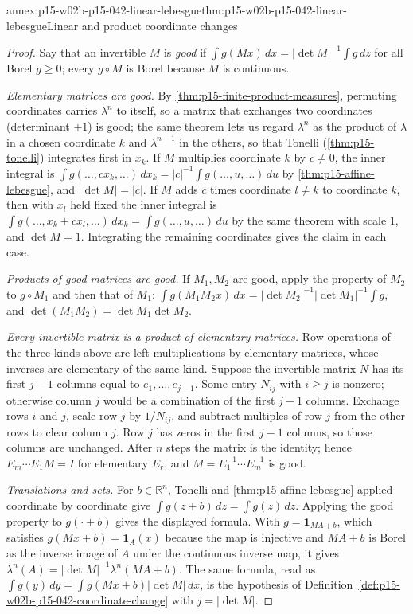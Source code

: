 \begin{annexitem}{annex:p15-w02b-p15-042-linear-lebesgue}{thm:p15-w02b-p15-042-linear-lebesgue}{Linear and product coordinate changes}
\begin{proof}
Say that an invertible \(M\) is \emph{good} if
\(\int g(Mx)\,dx=|\det M|^{-1}\int g\,dz\) for all Borel \(g\geq0\); every
\(g\circ M\) is Borel because \(M\) is continuous.

\emph{Elementary matrices are good.} By
\cref{thm:p15-finite-product-measures}, permuting coordinates carries
\(\lambda^n\) to itself, so a matrix that exchanges two coordinates
(determinant \(\pm1\)) is good; the same theorem lets us regard \(\lambda^n\)
as the product of \(\lambda\) in a chosen coordinate \(k\) and
\(\lambda^{n-1}\) in the others, so that Tonelli (\cref{thm:p15-tonelli})
integrates first in \(x_k\). If \(M\) multiplies coordinate \(k\) by
\(c\neq0\), the inner integral is
\(\int g(\ldots,cx_k,\ldots)\,dx_k=|c|^{-1}\int g(\ldots,u,\ldots)\,du\) by
\cref{thm:p15-affine-lebesgue}, and \(|\det M|=|c|\). If \(M\) adds \(c\)
times coordinate \(l\neq k\) to coordinate \(k\), then with \(x_l\) held
fixed the inner integral is
\(\int g(\ldots,x_k+cx_l,\ldots)\,dx_k=\int g(\ldots,u,\ldots)\,du\) by the
same theorem with scale \(1\), and \(\det M=1\). Integrating the remaining
coordinates gives the claim in each case.

\emph{Products of good matrices are good.} If \(M_1,M_2\) are good, apply
the property of \(M_2\) to \(g\circ M_1\) and then that of \(M_1\):
\(\int g(M_1M_2x)\,dx=|\det M_2|^{-1}|\det M_1|^{-1}\int g\), and
\(\det(M_1M_2)=\det M_1\det M_2\).

\emph{Every invertible matrix is a product of elementary matrices.} Row
operations of the three kinds above are left multiplications by elementary
matrices, whose inverses are elementary of the same kind. Suppose the
invertible matrix \(N\) has its first \(j-1\) columns equal to
\(e_1,\ldots,e_{j-1}\). Some entry \(N_{ij}\) with \(i\geq j\) is nonzero;
otherwise column \(j\) would be a combination of the first \(j-1\) columns.
Exchange rows \(i\) and \(j\), scale row \(j\) by \(1/N_{ij}\), and subtract
multiples of row \(j\) from the other rows to clear column \(j\). Row \(j\)
has zeros in the first \(j-1\) columns, so those columns are unchanged.
After \(n\) steps the matrix is the identity; hence
\(E_m\cdots E_1M=I\) for elementary \(E_r\), and
\(M=E_1^{-1}\cdots E_m^{-1}\) is good.

\emph{Translations and sets.} For \(b\in\mathbb R^n\), Tonelli and
\cref{thm:p15-affine-lebesgue} applied coordinate by coordinate give
\(\int g(z+b)\,dz=\int g(z)\,dz\). Applying the good property to
\(g(\cdot+b)\) gives the displayed formula. With \(g=\mathbf 1_{MA+b}\),
which satisfies \(g(Mx+b)=\mathbf 1_A(x)\) because the map is injective and
\(MA+b\) is Borel as the inverse image of \(A\) under the continuous inverse
map, it gives \(\lambda^n(A)=|\det M|^{-1}\lambda^n(MA+b)\). The same
formula, read as \(\int g(y)\,dy=\int g(Mx+b)|\det M|\,dx\), is the
hypothesis of Definition~\ref{def:p15-w02b-p15-042-coordinate-change} with
\(j=|\det M|\).


\end{proof}
\end{annexitem}

